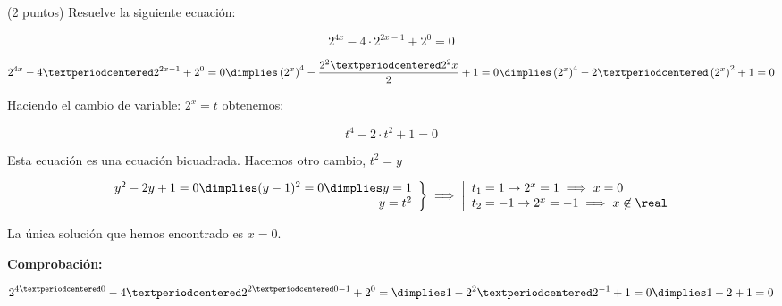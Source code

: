 \documentclass[palatino,nosec]{Docencia}
\begin{document}
\begin{problem} (2 puntos)
Resuelve la siguiente ecuación:

\[
	2^{4x}-4·2^{2x-1} + 2^0 = 0
\]

\solution

\[
	2^{4x}-4·2^{2x-1} + 2^0 = 0 \dimplies \left(2^x\right)^4 - \frac{2^2·2^2x}{2} + 1 = 0\dimplies \left(2^x\right)^4 - 2·\left(2^x\right)^2 + 1 = 0
\]

Haciendo el cambio de variable: $2^x = t$ obtenemos:

\[
	t^4 - 2·t^2 + 1 = 0 
\]

Esta ecuación es una ecuación bicuadrada. Hacemos otro cambio, $t^2 = y$

\[
	\left.\begin{array}{r}
		y^2-2y+1=0\dimplies (y-1)^2 = 0 \dimplies y=1 \\
		y=t^2
	\end{array}\right\}\implies \left|
	\begin{array}{l} 
		t_1=1 \to 2^x=1 \implies x=0\\
		t_2=-1 \to 2^x=-1 \implies x\not\in\real
	\end{array}\right.
\]

La única solución que hemos encontrado es $x=0$.

\textbf{Comprobación:}

\[
	2^{4·0} - 4·2^{2·0-1}+2^0 = \dimplies 1-2^2·2^{-1} + 1 = 0 \dimplies 1-2+1 = 0
\]

\end{problem}
\end{document}
